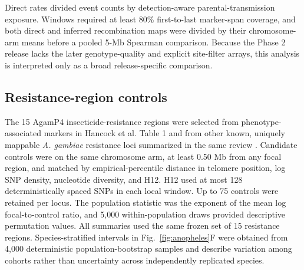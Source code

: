 Direct rates divided event counts by detection-aware parental-transmission exposure. Windows required at least 80\% first-to-last marker-span coverage, and both direct and inferred recombination maps were divided by their chromosome-arm means before a pooled 5-Mb Spearman comparison. Because the Phase 2 release lacks the later genotype-quality and explicit site-filter arrays, this analysis is interpreted only as a broad release-specific comparison.

\subsection*{Resistance-region controls}

The 15 AgamP4 insecticide-resistance regions were selected from phenotype-associated markers in Hancock et al. Table 1 and from other known, uniquely mappable \textit{A. gambiae} resistance loci summarized in the same review \citep{hancock2024surveillance}. Candidate controls were on the same chromosome arm, at least 0.50 Mb from any focal region, and matched by empirical-percentile distance in telomere position, log SNP density, nucleotide diversity, and H12. H12 used at most 128 deterministically spaced SNPs in each local window. Up to 75 controls were retained per locus. The population statistic was the exponent of the mean log focal-to-control ratio, and 5,000 within-population draws provided descriptive permutation values. All summaries used the same frozen set of 15 resistance regions. Species-stratified intervals in Fig.~\ref{fig:anopheles}F were obtained from 4,000 deterministic population-bootstrap samples and describe variation among cohorts rather than uncertainty across independently replicated species.
